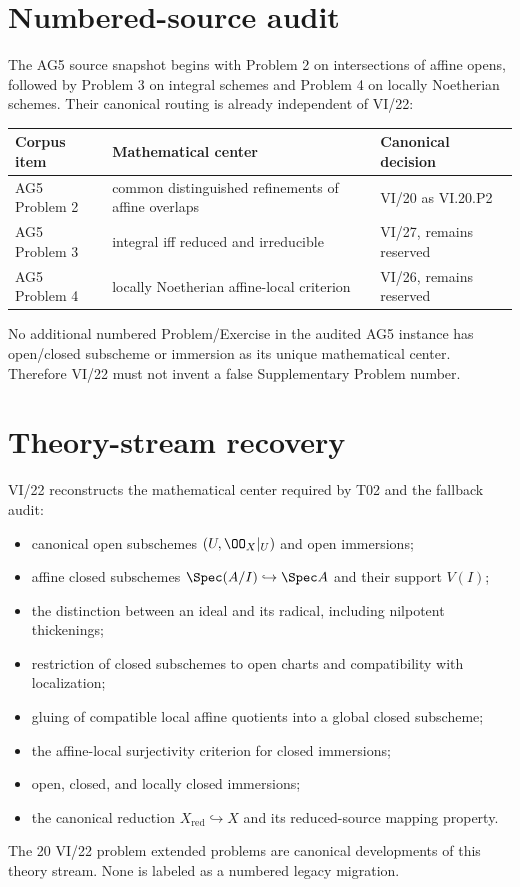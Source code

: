 \section*{Numbered-source audit}
The AG5 source snapshot begins with Problem 2 on intersections of affine opens, followed by
Problem 3 on integral schemes and Problem 4 on locally Noetherian schemes.  Their canonical
routing is already independent of VI/22:
\begin{center}
\begin{tabular}{>{\raggedright\arraybackslash}p{}>{\raggedright\arraybackslash}p{}>{\raggedright\arraybackslash}p{}}
\toprule
Corpus item & Mathematical center & Canonical decision\\
\midrule
AG5 Problem 2 & common distinguished refinements of affine overlaps & VI/20 as VI.20.P2\\
AG5 Problem 3 & integral iff reduced and irreducible & VI/27, remains reserved\\
AG5 Problem 4 & locally Noetherian affine-local criterion & VI/26, remains reserved\\
\bottomrule
\end{tabular}
\end{center}
No additional numbered Problem/Exercise in the audited AG5 instance has open/closed
subscheme or immersion as its unique mathematical center.  Therefore VI/22 must not invent a
false Supplementary Problem number.

\section*{Theory-stream recovery}
VI/22 reconstructs the mathematical center required by T02 and the fallback audit:
\begin{itemize}
\item canonical open subschemes $(U,\OO_X|_U)$ and open immersions;
\item affine closed subschemes $\Spec(A/I)\hookrightarrow\Spec A$ and their support $V(I)$;
\item the distinction between an ideal and its radical, including nilpotent thickenings;
\item restriction of closed subschemes to open charts and compatibility with localization;
\item gluing of compatible local affine quotients into a global closed subscheme;
\item the affine-local surjectivity criterion for closed immersions;
\item open, closed, and locally closed immersions;
\item the canonical reduction $X_{\mathrm{red}}\hookrightarrow X$ and its reduced-source mapping property.
\end{itemize}
The 20 VI/22 problem extended problems are canonical developments of this theory stream.  None is labeled
as a numbered legacy migration.

